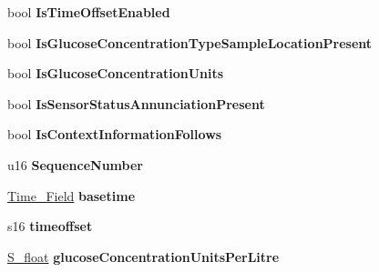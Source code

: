 \begin{DoxyCompactItemize}
\item 
bool {\bfseries Is\+Time\+Offset\+Enabled}\hypertarget{struct_b_l_e___g_l_u_c_o_s_e___measurement_a666955b8a82376ae535f9006d4199c71}{}\label{struct_b_l_e___g_l_u_c_o_s_e___measurement_a666955b8a82376ae535f9006d4199c71}

\item 
bool {\bfseries Is\+Glucose\+Concentration\+Type\+Sample\+Location\+Present}\hypertarget{struct_b_l_e___g_l_u_c_o_s_e___measurement_a097d74fe1e4d05fdbb68d788467a62f4}{}\label{struct_b_l_e___g_l_u_c_o_s_e___measurement_a097d74fe1e4d05fdbb68d788467a62f4}

\item 
bool {\bfseries Is\+Glucose\+Concentration\+Units}\hypertarget{struct_b_l_e___g_l_u_c_o_s_e___measurement_afc4b628fd3e5ec75015c361d4ffcf91f}{}\label{struct_b_l_e___g_l_u_c_o_s_e___measurement_afc4b628fd3e5ec75015c361d4ffcf91f}

\item 
bool {\bfseries Is\+Sensor\+Status\+Annunciation\+Present}\hypertarget{struct_b_l_e___g_l_u_c_o_s_e___measurement_a8bafc7b02c9efcbcde6ea10a498a861b}{}\label{struct_b_l_e___g_l_u_c_o_s_e___measurement_a8bafc7b02c9efcbcde6ea10a498a861b}

\item 
bool {\bfseries Is\+Context\+Information\+Follows}\hypertarget{struct_b_l_e___g_l_u_c_o_s_e___measurement_a5c75749af015e9cddca808c52d6dad1d}{}\label{struct_b_l_e___g_l_u_c_o_s_e___measurement_a5c75749af015e9cddca808c52d6dad1d}

\item 
u16 {\bfseries Sequence\+Number}\hypertarget{struct_b_l_e___g_l_u_c_o_s_e___measurement_ad69fddf9201b23738824afb7cf198b37}{}\label{struct_b_l_e___g_l_u_c_o_s_e___measurement_ad69fddf9201b23738824afb7cf198b37}

\item 
\hyperlink{struct_time___field}{Time\+\_\+\+Field} {\bfseries basetime}\hypertarget{struct_b_l_e___g_l_u_c_o_s_e___measurement_a71c2e7af63c6ec4e6ee1dd3c23860ae3}{}\label{struct_b_l_e___g_l_u_c_o_s_e___measurement_a71c2e7af63c6ec4e6ee1dd3c23860ae3}

\item 
s16 {\bfseries timeoffset}\hypertarget{struct_b_l_e___g_l_u_c_o_s_e___measurement_ae539808e6739ecfc1f71ecdda7e88079}{}\label{struct_b_l_e___g_l_u_c_o_s_e___measurement_ae539808e6739ecfc1f71ecdda7e88079}

\item 
\hyperlink{struct_s__float}{S\+\_\+float} {\bfseries glucose\+Concentration\+Units\+Per\+Litre}\hypertarget{struct_b_l_e___g_l_u_c_o_s_e___measurement_ae63437d8181849c325a6d42e391bb703}{}\label{struct_b_l_e___g_l_u_c_o_s_e___measurement_ae63437d8181849c325a6d42e391bb703}


\end{DoxyCompactItemize}

